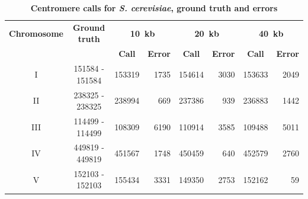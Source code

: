 \begin{table}[ht!]
\caption{\textbf{Centromere calls for \textit{S. cerevisiae}, ground truth and
errors}}
\vspace{10pt}
\small
\begin{center}
\begin{tabular}{c | c  r  r  r  r r r}
\textbf{Chromosome}  & \textbf{Ground truth} & \multicolumn{2}{c}{\textbf{10~kb}} & \multicolumn{2}{c}{\textbf{20~kb}} & \multicolumn{2}{c}{\textbf{40~kb}} \\
  &   &  \multicolumn{1}{c}{\textbf{Call}} &  \multicolumn{1}{c}{\textbf{Error}} &  \multicolumn{1}{c}{\textbf{Call}} &  \multicolumn{1}{c}{\textbf{Error}} &  \multicolumn{1}{c}{\textbf{Call}} &  \multicolumn{1}{c}{\textbf{Error}} \\
\hline
I & \num[group-separator={\,}]{151584} - \num[group-separator={\,}]{151584} & \num[group-separator={\,}]{153319} & \small{\num[group-separator={\,}]{1735}}  & \num[group-separator={\,}]{154614} & \small{\num[group-separator={\,}]{3030}}  & \num[group-separator={\,}]{153633} & \small{\num[group-separator={\,}]{2049}}  \\
II & \num[group-separator={\,}]{238325} - \num[group-separator={\,}]{238325} & \num[group-separator={\,}]{238994} & \small{\num[group-separator={\,}]{669}}  & \num[group-separator={\,}]{237386} & \small{\num[group-separator={\,}]{939}}  & \num[group-separator={\,}]{236883} & \small{\num[group-separator={\,}]{1442}}  \\
III & \num[group-separator={\,}]{114499} - \num[group-separator={\,}]{114499} & \num[group-separator={\,}]{108309} & \small{\num[group-separator={\,}]{6190}}  & \num[group-separator={\,}]{110914} & \small{\num[group-separator={\,}]{3585}}  & \num[group-separator={\,}]{109488} & \small{\num[group-separator={\,}]{5011}}  \\
IV & \num[group-separator={\,}]{449819} - \num[group-separator={\,}]{449819} & \num[group-separator={\,}]{451567} & \small{\num[group-separator={\,}]{1748}}  & \num[group-separator={\,}]{450459} & \small{\num[group-separator={\,}]{640}}  & \num[group-separator={\,}]{452579} & \small{\num[group-separator={\,}]{2760}}  \\
V & \num[group-separator={\,}]{152103} - \num[group-separator={\,}]{152103} & \num[group-separator={\,}]{155434} & \small{\num[group-separator={\,}]{3331}}  & \num[group-separator={\,}]{149350} & \small{\num[group-separator={\,}]{2753}}  & \num[group-separator={\,}]{152162} & \small{\num[group-separator={\,}]{59}}  \\

\end{tabular}
\end{center}
\end{table}
